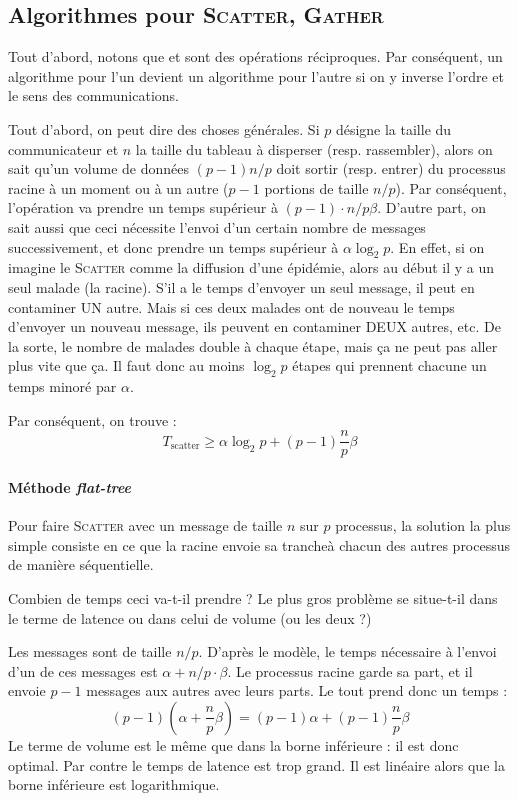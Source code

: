 \subsection{Algorithmes pour \textsc{Scatter}, \textsc{Gather}}

Tout d'abord, notons que  et  sont des
opérations réciproques. Par conséquent, un algorithme pour l'un
devient un algorithme pour l'autre  si on y inverse l'ordre et le sens
des communications.

Tout d'abord, on peut dire des choses générales. Si $p$ désigne la taille du
communicateur et $n$ la taille du tableau à disperser (resp. rassembler), alors
on sait qu'un volume de données $(p-1) n / p$ doit sortir (resp. entrer) du
processus racine à un moment ou à un autre ($p-1$ portions de taille $n/p$). Par
conséquent, l'opération va prendre un temps supérieur à
$(p-1) \cdot n / p \beta$. D'autre part, on sait aussi que ceci nécessite
l'envoi d'un certain nombre de messages successivement, et donc prendre un temps
supérieur à $\alpha \log_2 p$. En effet, si on imagine le \textsc{Scatter} comme
la diffusion d'une épidémie, alors au début il y a un seul malade (la \og
racine\fg). S'il a le temps d'envoyer un seul message, il peut en contaminer UN
autre. Mais si ces deux malades ont de nouveau le temps d'envoyer un nouveau
message, ils peuvent en contaminer DEUX autres, etc. De la sorte, le nombre de
malades double à chaque étape, mais ça ne peut pas aller plus vite que ça. Il
faut donc au moins $\log_2 p$ étapes qui prennent chacune un temps minoré par
$\alpha$.

Par conséquent, on trouve :
\[
T_{\mathrm{scatter}} \geq \alpha \log_2 p + (p-1)\frac{n}{p} \beta
\]

\paragraph{Méthode \og \emph{flat-tree}\fg }

Pour faire \textsc{Scatter} avec un message de taille $n$ sur $p$ processus, la
solution la plus simple consiste en ce que la racine envoie sa \og tranche\fg à
chacun des autres processus de manière séquentielle.

Combien de temps ceci va-t-il prendre ? Le plus gros problème se situe-t-il dans
le terme de latence ou dans celui de volume (ou les deux ?)

Les messages sont de taille $n/p$. D'après le modèle, le temps nécessaire à
l'envoi d'un de ces messages est $\alpha + n/p \cdot \beta$. Le processus racine
garde sa part, et il envoie $p-1$ messages aux autres avec leurs parts. Le tout
prend donc un temps :
\[
 (p-1) \left(\alpha + \frac{n}{p} \beta\right) = (p-1) \alpha + (p-1)\frac{n}{p} \beta
\]
Le terme de volume est le même que dans la borne inférieure : il est
donc optimal. Par contre le temps de latence est trop grand. Il est
linéaire alors que la borne inférieure est logarithmique.

